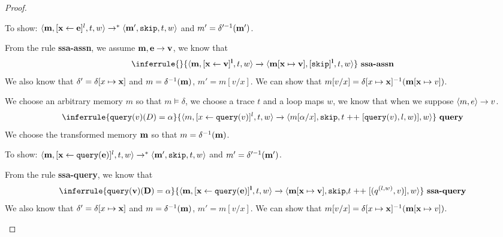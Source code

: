 \documentclass[a4paper,11pt]{article}
\begin{document}
\begin{proof}
\begin{itemize}
 To show: $\langle \mathbf{{m}}, [\mathrel{ \mathbf{{x}} \leftarrow  \mathbf{{e}} }]^{l} , t, w \rangle \to^{*} \langle \mathbf{{m'}}, \mathtt{skip}, t, w \rangle $ and $ m' = \delta'^{-1}(\mathbf{{m'}}) $.
 
 From the rule \textbf{ssa-assn}, we assume $\mathbf{{m}}, \mathbf{{e}} \to \mathbf{{v}}$, we know that 
 \[
 \inferrule
{
}
{
\config{\ssa{ m, [\assign x v]^{l}},  t,w } \xrightarrow{} \config{\ssa{m[x \mapsto v], [\eskip]^{l}}, t,w }
}
~\textbf{ssa-assn}
 \]
 We also know that $\delta'= \delta[x \mapsto \mathbf{{x}}]$ and $m = \delta^{-1}(\mathbf{{m}})$, $m'= m[v/x]$. We can show that $ m[v/x] = \delta[x \mapsto \mathbf{{x}}]^{-1}(\mathbf{{m}}[\mathbf{{x}} \mapsto v]) $.
 
We choose an arbitrary memory $m$ so that $m \vDash \delta$, we choose a trace $t$ and a loop maps $w$, we know that when we suppose $\langle m, e \rangle \to v$.
 \[
\inferrule
{
\query(v)(D) = \qval 
}
{
\config{m, [\assign{x}{\query(v)}]^l, t, w} \xrightarrow{} \config{m[ \qval/ x], \eskip,  t \mathrel{++} [\query(v),l,w )],w }
}
~\textbf{query}
 \]
 We choose the transformed memory ${\mathbf{{m}}} $ so that  $ m =\delta^{-1}(\mathbf{{m}})$.
 
 To show: $\langle \mathbf{{m}}, [\mathrel{ \mathbf{{x}} \leftarrow  \mathbf{{{\tt query}(e)}} }]^{l} , t, w \rangle \to^{*} \langle \mathbf{{m'}}, \mathtt{skip}, t, w \rangle $ and $ m' = \delta'^{-1}(\mathbf{{m'}}) $.
 
 From the rule \textbf{ssa-query}, we know that 
 \[
 \inferrule
{
\ssa{\query(v)(D) = \qval} 
}
{
\config{ \ssa{ m, [\assign{\ssa{x}}{\ssa{\query(\expr)}}]^l}, t, w} \xrightarrow{} \config{\ssa{  m[  x \mapsto v], \eskip,}  t \mathrel{++} [(q^{(l,w )},v)],w }
}
~\textbf{ssa-query}
 \]
 We also know that $\delta'= \delta[x \mapsto \mathbf{{x}}]$ and $m = \delta^{-1}(\mathbf{{m}})$, $m'= m[v/x]$. We can show that $ m[v/x] = \delta[x \mapsto \mathbf{{x}}]^{-1}(\mathbf{{m}}[\mathbf{{x}} \mapsto v]) $.


\end{itemize}
\end{proof}
\end{document}

